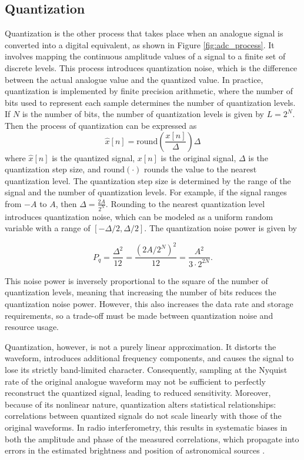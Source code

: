 \subsection{Quantization}
\label{sec:quantization}
Quantization is the other process that takes place when an analogue signal is converted into a digital equivalent, as shown in Figure \ref{fig:adc_process}. It involves mapping the continuous amplitude values of a signal to a finite set of discrete levels. This process introduces quantization noise, which is the difference between the actual analogue value and the quantized value. In practice, quantization is implemented by finite precision arithmetic, where the number of bits used to represent each sample determines the number of quantization levels. If $N$ is the number of bits, the number of quantization levels is given by $L = 2^N$. Then the process of quantization can be expressed as
\begin{equation}
	\hat{x}[n] = \text{round}\left(\frac{x[n]}{\Delta}\right) \Delta
	\label{eq:quantization}
\end{equation}
where $\hat{x}[n]$ is the quantized signal, $x[n]$ is the original signal, $\Delta$ is the quantization step size, and $\text{round}(\cdot)$ rounds the value to the nearest quantization level. The quantization step size is determined by the range of the signal and the number of quantization levels. For example, if the signal ranges from $-A$ to $A$, then $\Delta = \frac{2A}{2^N}$. Rounding to the nearest quantization level introduces quantization noise, which can be modeled as a uniform random variable with a range of $[-\Delta/2, \Delta/2]$. The quantization noise power is given by

\begin{equation}
	P_q = \frac{\Delta^2}{12} = \frac{(2A/2^N)^2}{12} = \frac{A^2}{3 \cdot 2^{2N}}.
	\label{eq:quantization_noise_power}
\end{equation}

This noise power is inversely proportional to the square of the number of quantization levels, meaning that increasing the number of bits reduces the quantization noise power. However, this also increases the data rate and storage requirements, so a trade-off must be made between quantization noise and resource usage. 

Quantization, however, is not a purely linear approximation. It distorts the waveform, introduces additional frequency components, and causes the signal to lose its strictly band-limited character. Consequently, sampling at the Nyquist rate of the original analogue waveform may not be sufficient to perfectly reconstruct the quantized signal, leading to reduced sensitivity. Moreover, because of its nonlinear nature, quantization alters statistical relationships: correlations between quantized signals do not scale linearly with those of the original waveforms. In radio interferometry, this results in systematic biases in both the amplitude and phase of the measured correlations, which propagate into errors in the estimated brightness and position of astronomical sources \citep{menaparra2018quantizationbiasdigitalcorrelators}.

